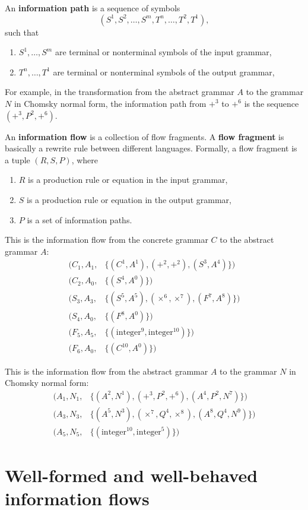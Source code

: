 \documentclass{amsart}
\begin{document}
An \textbf{information path} is a sequence of symbols
\[
(S^1,S^2,\ldots,S^m,T^n,\ldots,T^2,T^1),
\]
such that
\begin{enumerate}
\item $S^1,\ldots,S^m$ are terminal or nonterminal symbols of the
input grammar,
\item $T^n,\ldots,T^1$ are terminal or nonterminal symbols of the
output grammar,
\end{enumerate}
For example, in the transformation from the abstract grammar $A$
to the grammar $N$ in Chomsky normal form, the information path
from $+^3$ to $+^6$ is the sequence $(+^3,P^2,+^6)$.

An \textbf{information flow} is a collection of flow fragments. A
\textbf{flow fragment} is basically a rewrite rule between
different languages. Formally, a flow fragment is a tuple
$(R,S,P)$, where
\begin{enumerate}
\item $R$ is a production rule or equation in the input grammar,
\item $S$ is a production rule or equation in the output grammar,
\item $P$ is a set of information paths.
\end{enumerate}

This is the information flow from the concrete grammar $C$ to the
abstract grammar $A$:
\begin{align*}
(C_1,A_1,&\{(C^1,A^1),(+^2,+^2),(S^3,A^4)\})\\
(C_2,A_0,&\{(S^4,A^0)\})\\
(S_3,A_3,&\{(S^5,A^5),(\times^6,\times^7),(F^7,A^8)\})\\
(S_4,A_0,&\{(F^8,A^0)\})\\
(F_5,A_5,&\{(\mbox{integer}^9,\mbox{integer}^{10})\})\\
(F_6,A_0,&\{(C^{10},A^0)\})
\end{align*}

This is the information flow from the abstract grammar $A$ to the
grammar $N$ in Chomsky normal form:
\begin{align*}
(A_1,N_1,&\{(A^2,N^1),(+^3,P^2,+^6),(A^4,P^2,N^7)\})\\
(A_3,N_3,&\{(A^5,N^3),(\times^7,Q^4,\times^8),(A^8,Q^4,N^9)\})\\
(A_5,N_5,&\{(\mbox{integer}^{10},\mbox{integer}^5)\})
\end{align*}


\section{Well-formed and well-behaved information flows}
\end{document}
